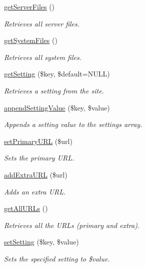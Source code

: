 \begin{DoxyCompactItemize}
\hyperlink{classDrupalSite_aa09ad5d5676e2f5953cd7f7df68eedf9}{get\-Server\-Files} ()
\begin{DoxyCompactList}\small\item\em Retrieves all server files. \end{DoxyCompactList}\item 
\hyperlink{classDrupalSite_aedd15bbc27ff19bcfc022f69bdd3efb2}{get\-System\-Files} ()
\begin{DoxyCompactList}\small\item\em Retrieves all system files. \end{DoxyCompactList}\item 
\hyperlink{classDrupalSite_a62af99ae8b14a035d42b86ffa4563f97}{get\-Setting} (\$key, \$default=N\-U\-L\-L)
\begin{DoxyCompactList}\small\item\em Retrieves a setting from the site. \end{DoxyCompactList}\item 
\hyperlink{classDrupalSite_aeea4e89b17c15ca8fdb935626ff5b013}{append\-Setting\-Value} (\$key, \$value)
\begin{DoxyCompactList}\small\item\em Appends a setting value to the settings array. \end{DoxyCompactList}\item 
\hyperlink{classDrupalSite_adccf702a1e724e6e14f815f280d18ce2}{set\-Primary\-U\-R\-L} (\$url)
\begin{DoxyCompactList}\small\item\em Sets the primary U\-R\-L. \end{DoxyCompactList}\item 
\hyperlink{classDrupalSite_a8dadb2dee1366d250e570ade9b9c4f0d}{add\-Extra\-U\-R\-L} (\$url)
\begin{DoxyCompactList}\small\item\em Adds an extra U\-R\-L. \end{DoxyCompactList}\item 
\hyperlink{classDrupalSite_a34cbbd0ec10bdafc70251407e27c0dda}{get\-All\-U\-R\-Ls} ()
\begin{DoxyCompactList}\small\item\em Retrieves all the U\-R\-Ls (primary and extra). \end{DoxyCompactList}\item 
\hyperlink{classDrupalSite_a7136efbd5f8544a2d0d6464012986c51}{set\-Setting} (\$key, \$value)
\begin{DoxyCompactList}\small\item\em Sets the specified setting to \$value. \end{DoxyCompactList}\item 

\end{DoxyCompactItemize}
